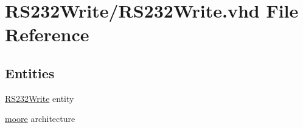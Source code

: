 \hypertarget{_r_s232_write_8vhd}{}\section{R\+S232\+Write/\+R\+S232\+Write.vhd File Reference}
\label{_r_s232_write_8vhd}
\subsection*{Entities}
\begin{DoxyCompactItemize}
\item 
\hyperlink{class_r_s232_write}{R\+S232\+Write} entity
\item 
\hyperlink{class_r_s232_write_1_1moore}{moore} architecture
\end{DoxyCompactItemize}
